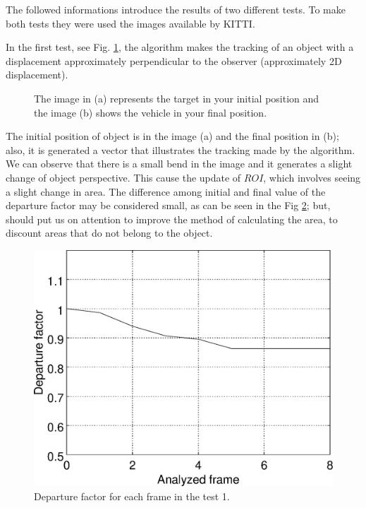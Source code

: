 The followed informations introduce the results of two different tests. 
To make both tests they were used the images available by KITTI\cite{Geiger}.


In the first test, see Fig. \ref{fig:imgpapercerta}, 
the algorithm makes the tracking of an object with 
a displacement approximately perpendicular to the observer (approximately 2D displacement).
\begin{figure}[!hbt]
\centering
  \caption{The image in (a) represents the target in your initial position 
   and the image (b) shows the vehicle in your final position.}
  \label{fig:imgpapercerta}
\end{figure}
The initial position of object is in the image (a) and the final position in (b); 
also, it is generated a vector that  illustrates the tracking made by the algorithm.
We can observe that there is a small bend in the image 
and it generates a slight change of object perspective. 
This cause the update of $ROI$, which involves seeing a slight change in area.
The difference among initial and final value of the departure factor may 
be considered small, as can be seen in the Fig \ref{fig:res_graph1};
but, should put us on attention to improve the method of calculating the area,
to discount areas that do not belong to the object.
\begin{figure}[!hbt]
\centering
\includegraphics[width=0.8\columnwidth]{images/graph1.eps}
\caption{Departure factor for each frame in the test 1.}
\label{fig:res_graph1}
\end{figure}
